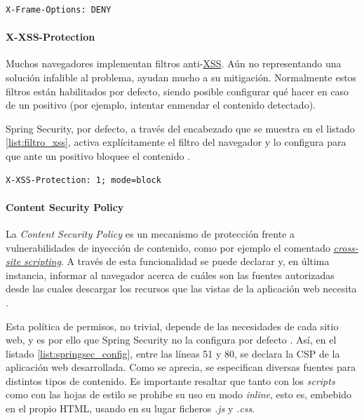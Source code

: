 \documentclass[a4paper,12pt,twoside,openright]{report}
\begin{document}
	\begin{lstlisting}[caption=Cabecera que inhibe el uso de las etiquetas \emph{iframe}, label=list:iframe]
	 X-Frame-Options: DENY
	\end{lstlisting}
	
	\paragraph{X-XSS-Protection}
	Muchos navegadores implementan filtros anti-\href{https://owasp.org/www-community/attacks/xss/}{XSS}. Aún no representando una solución infalible al problema, ayudan mucho a su mitigación. Normalmente estos filtros están habilitados por defecto, siendo posible configurar qué hacer en caso de un positivo (por ejemplo, intentar enmendar el contenido detectado).
	
	Spring Security, por defecto, a través del encabezado que se muestra en el listado \ref{list:filtro_xss}, activa explícitamente el filtro del navegador y lo configura para que ante un positivo bloquee el contenido \cite{Alex2020}.
	\\
	
	\begin{lstlisting}[caption=Cabecera que activa y configura el filtro anti-XSS del navegador, label=list:filtro_xss]
	X-XSS-Protection: 1; mode=block
	\end{lstlisting}
	
	\paragraph{Content Security Policy}
	La \emph{Content Security Policy} es un mecanismo de protección frente a vulnerabilidades de inyección de contenido, como por ejemplo el comentado \href{https://owasp.org/www-community/attacks/xss/}{\emph{cross-site scripting}}. A través de esta funcionalidad se puede declarar y, en última instancia, informar al navegador acerca de cuáles son las fuentes autorizadas desde las cuales descargar los recursos que las vistas de la aplicación web necesita \cite{Mozilla2020} \cite{West2012}.
	
	Esta política de permisos, no trivial, depende de las necesidades de cada sitio web, y es por ello que Spring Security no la configura por defecto \cite{Alex2020}. Así, en el listado \ref{list:springsec_config}, entre las líneas 51 y 80, se declara la CSP de la aplicación web desarrollada. Como se aprecia, se especifican diversas fuentes para distintos tipos de contenido. Es importante resaltar que tanto con los \emph{scripts} como con las hojas de estilo se prohibe su uso en modo \emph{inline}, esto es, embebido en el propio HTML, usando en su lugar ficheros \emph{.js} y \emph{.css}.
	
\end{document}

